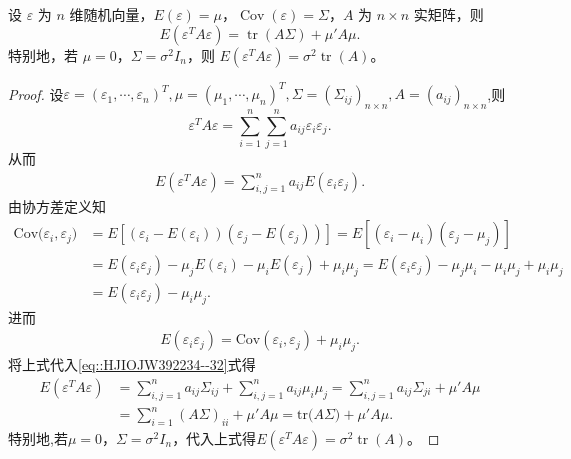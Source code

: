\documentclass[lang=cn,newtx,10pt,sCheme=Chinese,citestyle=gb7714-2015, bibstyle=gb7714-2015]{../../Template/elegantbook}
\begin{document}
\begin{lemma}[二次型期望公式]\label{lemma:二次型期望公式}
设 $\varepsilon$ 为 $n$ 维随机向量，$E(\varepsilon)=\mu$，$\operatorname{Cov}(\varepsilon)=\Sigma$，$A$ 为 $n\times n$ 实矩阵，则
\[
E(\varepsilon^T A \varepsilon) = \operatorname{tr}(A\Sigma) + \mu' A \mu.
\]
特别地，若 $\mu=0$，$\Sigma=\sigma^2 I_n$，则 $E(\varepsilon^TA\varepsilon)=\sigma^2\operatorname{tr}(A)$。
\end{lemma}
\begin{proof}

设$\varepsilon =\left( \varepsilon _1,\cdots ,\varepsilon _n \right) ^T,\mu =\left( \mu _1,\cdots ,\mu _n \right) ^T,\Sigma =\left( \Sigma _{ij} \right) _{n\times n},A=\left( a_{ij} \right) _{n\times n}$,则
\[
\varepsilon^T A \varepsilon = \sum_{i=1}^n\sum_{j=1}^n a_{ij}\varepsilon_i\varepsilon_j.
\]
从而
\begin{align}\label{eq::HJIOJW392234--32}
E(\varepsilon^T A\varepsilon )=\sum_{i,j=1}^n{a_{ij}E(\varepsilon _i\varepsilon _j)}.
\end{align}
由协方差定义知
\begin{align*}
\mathrm{Cov(}\varepsilon _i,\varepsilon _j)&=E\left[ \left( \varepsilon _i-E\left( \varepsilon _i \right) \right) \left( \varepsilon _j-E\left( \varepsilon _j \right) \right) \right] =E\left[ \left( \varepsilon _i-\mu _i \right) \left( \varepsilon _j-\mu _j \right) \right] 
\\
&=E\left( \varepsilon _i\varepsilon _j \right) -\mu _jE\left( \varepsilon _i \right) -\mu _iE\left( \varepsilon _j \right) +\mu _i\mu _j=E\left( \varepsilon _i\varepsilon _j \right) -\mu _j\mu _i-\mu _i\mu _j+\mu _i\mu _j
\\
&=E\left( \varepsilon _i\varepsilon _j \right) -\mu _i\mu _j.
\end{align*}
进而
\begin{align*}
E\left( \varepsilon _i\varepsilon _j \right) =\mathrm{Cov}\left( \varepsilon _i,\varepsilon _j \right) +\mu _i\mu _j.
\end{align*}
将上式代入\eqref{eq::HJIOJW392234--32}式得
\begin{align*}
E(\varepsilon^T A\varepsilon )&=\sum_{i,j=1}^n{a_{ij}\Sigma _{ij}}+\sum_{i,j=1}^n{a_{ij}\mu _i\mu _j}=\sum_{i,j=1}^n{a_{ij}\Sigma _{ji}}+\mu ' A\mu 
\\
&=\sum_{i=1}^n{(A\Sigma )_{ii}}+\mu' A\mu =\mathrm{tr(}A\Sigma )+\mu' A\mu .
\end{align*}
特别地,若$\mu=0$，$\Sigma=\sigma^2 I_n$，代入上式得$E(\varepsilon^TA\varepsilon)=\sigma^2\operatorname{tr}(A)$。
\end{proof}
\end{document}

